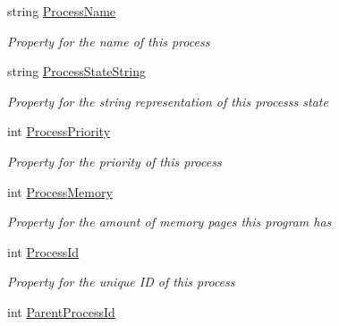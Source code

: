 \begin{DoxyCompactItemize}
string \hyperlink{class_c_p_u___o_s___simulator_1_1_operating___system_1_1_simulator_process_a8dfd5005352af61610e945094c5369b8}{Process\+Name}
\begin{DoxyCompactList}\small\item\em Property for the name of this process \end{DoxyCompactList}\item 
string \hyperlink{class_c_p_u___o_s___simulator_1_1_operating___system_1_1_simulator_process_a3bd1a31943fcbd2ebb2402bd0fff705f}{Process\+State\+String}
\begin{DoxyCompactList}\small\item\em Property for the string representation of this process\textquotesingle{}s state \end{DoxyCompactList}\item 
int \hyperlink{class_c_p_u___o_s___simulator_1_1_operating___system_1_1_simulator_process_a5f5199c59eeb6696cdff475a3d752b8a}{Process\+Priority}
\begin{DoxyCompactList}\small\item\em Property for the priority of this process \end{DoxyCompactList}\item 
int \hyperlink{class_c_p_u___o_s___simulator_1_1_operating___system_1_1_simulator_process_a2a82c535caf78396aef37d4ba7815408}{Process\+Memory}
\begin{DoxyCompactList}\small\item\em Property for the amount of memory pages this program has \end{DoxyCompactList}\item 
int \hyperlink{class_c_p_u___o_s___simulator_1_1_operating___system_1_1_simulator_process_a83b9c6a1cace7e28127ced9225213100}{Process\+Id}
\begin{DoxyCompactList}\small\item\em Property for the unique I\+D of this process \end{DoxyCompactList}\item 
int \hyperlink{class_c_p_u___o_s___simulator_1_1_operating___system_1_1_simulator_process_a48fc58b8fc6669cfb7f68ce4394c22d2}{Parent\+Process\+Id}

\end{DoxyCompactItemize}

